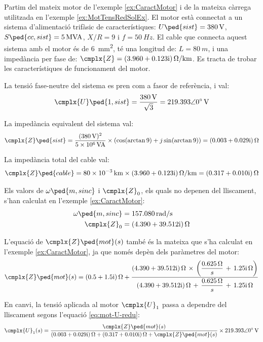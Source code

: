 \begin{exemple}\label{ex:MotTensRedIarr}
	\addcontentsxms{\MotTensRedIarr}
	Partim del mateix motor de l'exemple \vref{ex:CaractMotor} i de la mateixa càrrega utilitzada en l'exemple \vref{ex:MotTensRedSolEx}. El motor està connectat a un sistema d'alimentació trifàsic de característiques: $U\ped{sist}=\qty{380}{V}$, $S\ped{cc,sist}=\qty{5}{MVA}$, $X/R=9$ i $f=\qty{50}{Hz}$. El cable que connecta aquest sistema amb el motor és de \qty{6}{mm^2}, té una longitud de:  $L=\qty{80}{m}$, i una impedància per fase de: $\cmplx{Z} = \complexqty{3,960+j0,123}{\ohm/km}$. Es tracta de trobar les característiques de funcionament del motor.
	
	La tensió fase-neutre del sistema es pren com a fasor de referència, i val:
	\[
		\cmplx{U}\ped{1,sist} = \frac{\qty{380}{V}}{\sqrt{3}} = \complexqty{219,393:0}{V}
	\]
	
	La impedància equivalent del sistema val:
	\[
		\cmplx{Z}\ped{sist} = \frac{(\qty{380}{V})^2}{\qty{5e6}{VA}} \times (\cos(\arctan 9) + j \sin(\arctan 9)) = \complexqty{0,003+j0,029}{\ohm}	
	\]
	
	La impedància total del cable val:
	\[
		\cmplx{Z}\ped{cable} = \qty{80e-3}{km} \times \complexqty{3,960+j0,123}{\ohm/km} = \complexqty{0,317+j0,010}{\ohm}
	\]
	
	Els valors de $\omega\ped{m,sinc}$ i $\cmplx{Z}_0$, els quals no depenen del lliscament, s'han calculat en  l'exemple \ref{ex:CaractMotor}:
	\begin{align*}
		\omega\ped{m,sinc} &=  \qty{157,080}{rad/s} \\
		\cmplx{Z}_0 &=  \complexqty{4,390+j39,512}{\ohm} 
	\end{align*}
		
	L'equació de $\cmplx{Z}\ped{mot}(s)$ també és la mateixa que s'ha calculat en l'exemple  \ref{ex:CaractMotor}, ja que només depèn dels paràmetres del motor:
	\[
		\cmplx{Z}\ped{mot}(s) = \complexqty{0,5+j1,5}{\ohm} + \frac{\complexqty{4,390+j39,512}{\ohm}\,\times\,
		\left(\dfrac{\qty{0,625}{\ohm}}{s}\, + \, \complexqty{j1,25}{\ohm}\right)}{\complexqty{4,390+j39,512}{\ohm}\,+\,
		\dfrac{\qty{0,625}{\ohm}}{s}\, + \,\complexqty{j1,25}{\ohm}}
	\] 
	
	En canvi, la tensió aplicada al motor $\cmplx{U}_1$ passa a dependre del lliscament segons l'equació \eqref{eq:mot-U-redu}:
	\[
		\cmplx{U}_1(s) = \frac{\cmplx{Z}\ped{mot}(s)}{\complexqty{0,003+j0,029}{\ohm} + \complexqty{0,317+j0,010}{\ohm}  +  \cmplx{Z}\ped{mot}(s)} \times \complexqty{219,393:0}{V}
	\]
	

\end{exemple}

